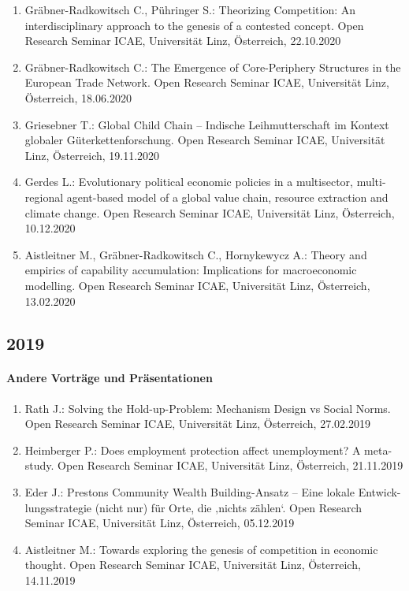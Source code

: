 \begin{enumerate}
	\item Gräbner-Radkowitsch C., Pühringer S.: Theorizing Competition: An interdisciplinary approach to the genesis of a contested concept. Open Research Seminar ICAE, Universität Linz, Österreich, 22.10.2020
	\item Gräbner-Radkowitsch C.: The Emergence of Core-Periphery Structures in the European Trade Network. Open Research Seminar ICAE, Universität Linz, Österreich, 18.06.2020
	\item Griesebner T.: Global Child Chain -- Indische Leihmutterschaft im Kontext globaler Güterkettenforschung. Open Research Seminar ICAE, Universität Linz, Österreich, 19.11.2020
	\item Gerdes L.: Evolutionary political economic policies in a multisector, multi-regional agent-based model of a global value chain, resource extraction and climate change. Open Research Seminar ICAE, Universität Linz, Österreich, 10.12.2020
	\item Aistleitner M., Gräbner-Radkowitsch C., Hornykewycz A.: Theory and empirics of capability accumulation: Implications for macroeconomic modelling. Open Research Seminar ICAE, Universität Linz, Österreich, 13.02.2020
\end{enumerate}
\subsection*{2019}
\paragraph{Andere Vorträge und Präsentationen}
\begin{enumerate}
	\item Rath J.: Solving the Hold-up-Problem: Mechanism Design vs Social Norms. Open Research Seminar ICAE, Universität Linz, Österreich, 27.02.2019
	\item Heimberger P.: Does employment protection affect unemployment? A meta-study. Open Research Seminar ICAE, Universität Linz, Österreich, 21.11.2019
	\item Eder J.: Prestons Community Wealth Building-Ansatz – Eine lokale Entwick-lungsstrategie (nicht nur) für Orte, die ‚nichts zählen‘. Open Research Seminar ICAE, Universität Linz, Österreich, 05.12.2019
	\item Aistleitner M.: Towards exploring the genesis of competition in economic thought. Open Research Seminar ICAE, Universität Linz, Österreich, 14.11.2019
\end{enumerate}
